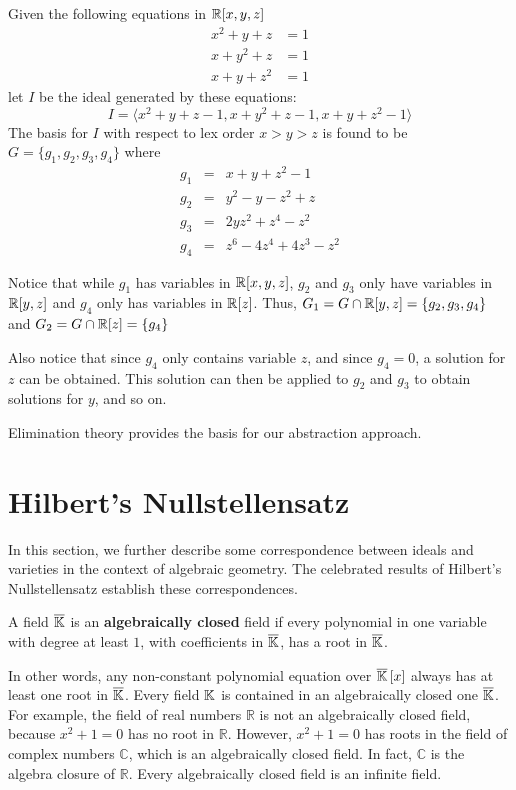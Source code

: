 \begin{Example}
Given the following equations in ${\mathbb{R}}[x,y,z]$
\begin{eqnarray}
x^2+y+z&=1 \nonumber \\
x+y^2+z&=1 \nonumber \\
x+y+z^2&=1 \nonumber
\end{eqnarray}
let $I$ be the ideal generated by these equations:
\begin{equation}
I=\langle x^2+y+z-1, x+y^2+z-1, x+y+z^2-1\rangle \nonumber
\end{equation}
The \Grobner basis for $I$ with respect to lex order $x>y>z$ is 
found to be $G=\{g_1,g_2,g_3,g_4\}$ where
\begin{eqnarray}
g_1&=&x+y+z^2-1 \nonumber \\
g_2&=&y^2-y-z^2+z \nonumber \\
g_3&=&2yz^2+z^4-z^2 \nonumber \\
g_4&=&z^6-4z^4+4z^3-z^2 \nonumber
\end{eqnarray}

Notice that while $g_1$ has variables in ${\mathbb{R}}[x,y,z]$, $g_2$ and $g_3$ only 
have variables in ${\mathbb{R}}[y,z]$ and $g_4$ only has variables in ${\mathbb{R}}[z]$. Thus, 
$G_1=G\cap {\mathbb{R}}[y,z]=\{g_2,g_3,g_4\}$ and $G_2=G\cap {\mathbb{R}}[z]=\{g_4\}$

Also notice that since $g_4$ only contains variable $z$, and since $g_4=0$, 
a solution for $z$ can be obtained. This solution can then be applied to 
$g_2$ and $g_3$ to obtain solutions for $y$, and so on.
\end{Example}

Elimination theory provides the basis for our abstraction approach.



\section{Hilbert's Nullstellensatz}

In this section, we further describe some correspondence between ideals and 
varieties in the context of algebraic geometry. The celebrated results of 
Hilbert's Nullstellensatz establish these correspondences.

\begin{Definition}\label{def:acf}
A field $\overline {{\mathbb{K}}}$ is an {\bf algebraically closed} field if every  
polynomial in one variable with degree at least $1$, with coefficients 
in $\overline {{\mathbb{K}}}$, has a root in $\overline {{\mathbb{K}}}$. 
\end{Definition}
In other words, any non-constant polynomial equation over 
$\overline {{\mathbb{K}}}\left[x\right]$ always has at least one root 
in $\overline {{\mathbb{K}}}$. Every field ${\mathbb{K}}$ is contained in an algebraically 
closed one $\overline {{\mathbb{K}}}$. 
For example, the field of real numbers $\mathbb{R}$ is not an algebraically closed 
field, because $x^2+1=0$ has no root in $\mathbb{R}$. 
However, $x^2+1=0$ has roots in the field of 
complex numbers $\mathbb{C}$, which is an algebraically closed field. 
In fact, $\mathbb{C}$ is the algebra closure of $\mathbb{R}$. 
Every algebraically closed field is an infinite field. 

